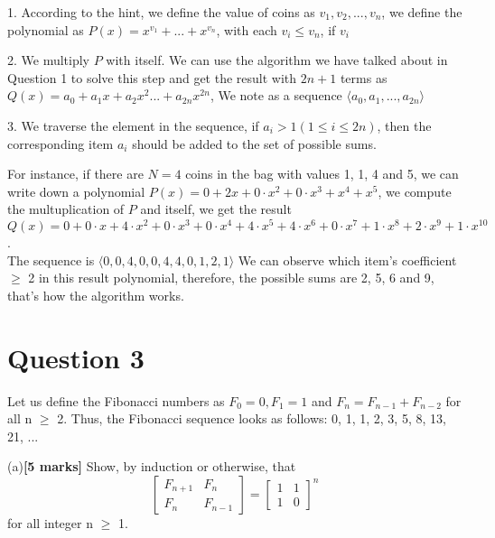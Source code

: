 \documentclass[a4paper,12pt]{article}
\begin{document}
1. According to the hint, we define the value of coins as $v_1, v_2, ..., v_n$, we define the polynomial as $P(x) = x^{v_1} + ... + x^{v_n}$, with each $v_i \leq v_n$, if $v_i$

2. We multiply $P$ with itself. We can use the algorithm we have talked about in Question 1 to solve this step and get the result with $2n+1$ terms as $Q(x) = a_0 + a_1x + a_2x^2... + a_{2n}x^{2n}$, We note as a sequence $\langle a_0, a_1,...,a_{2n} \rangle$

3. We traverse the element in the sequence, if $a_i > 1(1 \leq i \leq 2n)$, then the corresponding item $a_i$ should be added to the set of possible sums.\\

\everypar{\noindent} %

For instance, if there are $N = 4$ coins in the bag with values 1, 1, 4 and 5, we can write down a polynomial $P(x) = 0 + 2x + 0\cdot x^2 + 0\cdot x^3 + x^4 + x^5$, we compute the multuplication of $P$ and itself, we get the result $Q(x) = 0 + 0\cdot x + 4\cdot x^2 + 0\cdot x^3 + 0\cdot x^4 +4\cdot x^5 + 4\cdot x^6 + 0\cdot x^7 + 1\cdot x^8 + 2\cdot x^9 + 1\cdot x^{10}$.\\
The sequence is $\langle 0, 0, 4, 0, 0, 4, 4, 0, 1, 2, 1 \rangle$
We can observe which item's coefficient $\geq$ 2 in this result polynomial, therefore, the possible sums are 2, 5, 6 and 9, that's how the algorithm works. 






\newpage

\section*{Question 3}

Let us define the Fibonacci numbers as $F_0 = 0, F_1 = 1$ and $F_n = F_{n-1} +F_{n-2}$ for all n $\geq$ 2. Thus, the Fibonacci sequence looks as follows: 0, 1, 1, 2, 3, 5, 8, 13, 21, ...

(a)\textbf{[5 marks]} Show, by induction or otherwise, that 
\[
\begin{bmatrix}
F_{n+1} & F_{n}\\
F_{n} & F_{n-1}
\end{bmatrix}
=
\begin{bmatrix}
1 & 1\\
1 & 0
\end{bmatrix}
^n \] 
for all integer n $\geq$ 1.
\end{document}
